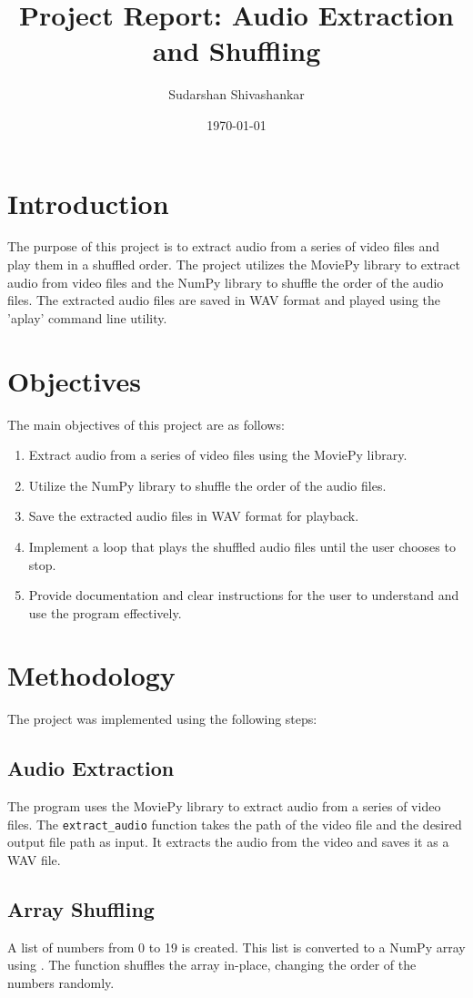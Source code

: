 \documentclass{article}
\title{Project Report: Audio Extraction and Shuffling}
\author{Sudarshan Shivashankar}
\date{\today}
\begin{document}
\maketitle

\section{Introduction}
The purpose of this project is to extract audio from a series of video files and play them in a shuffled order. The project utilizes the MoviePy library to extract audio from video files and the NumPy library to shuffle the order of the audio files. The extracted audio files are saved in WAV format and played using the 'aplay' command line utility.

\section{Objectives}
The main objectives of this project are as follows:
\begin{enumerate}
  \item Extract audio from a series of video files using the MoviePy library.
  \item Utilize the NumPy library to shuffle the order of the audio files.
  \item Save the extracted audio files in WAV format for playback.
  \item Implement a loop that plays the shuffled audio files until the user chooses to stop.
  \item Provide documentation and clear instructions for the user to understand and use the program effectively.
\end{enumerate}

\section{Methodology}
The project was implemented using the following steps:

\subsection{Audio Extraction}
The program uses the MoviePy library to extract audio from a series of video files. The \texttt{extract\_audio} function takes the path of the video file and the desired output file path as input. It extracts the audio from the video and saves it as a WAV file.

\subsection{Array Shuffling}
A list of numbers from 0 to 19 is created. This list is converted to a NumPy array using . The  function shuffles the array in-place, changing the order of the numbers randomly.
\end{document}
